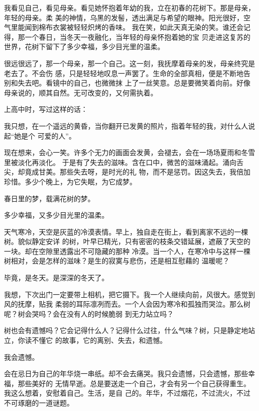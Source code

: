 		我看见自己，看见母亲。看见她怀抱着年幼的我，立在初春的花树下。那是母亲，年轻的母亲。柔
	美的神情，乌黑的发髻，透出满足与希望的眼神。阳光很好，空气里能闻到棉布衣裳被轻轻炽烤的香味。
	我在笑，如此天真无染的笑。谁还会记得，那一个春日，当冬天一夜融化，当年轻的母亲怀抱着她的宝
	贝走进这复苏的世界，花树下留下了多少幸福，多少目光里的温柔。

		很远很远了，那一个母亲，那一个自己。这一刻，我抚摩着母亲的发，母亲终究是老去了。不会伤
	感，只是轻轻地叹息一声罢了。生命的全部真相，便是不断地告别和失去吧。看镜中的自己，也微微抹
	上了一丝笑意。总是要微笑着向前。好像母亲说的，顺其自然。无可改变的，又何需执着。

		上高中时，写过这样的话：

		\longpoem{}{}{} \setlength{\parindent}{2\ccwd}
			我只想，在一个遥远的黄昏，当你翻开已发黄的照片，指着年轻的我，对什么人说起“她是个
		可爱的人”。
		\endlongpoem

		现在想来，会心一笑。许多个无力的画面会发黄，会褪去，会在一场场夏雨和冬雪里被淡化再淡化。
	于是有了失去的滋味。含在口中，微苦的滋味涌起。涌向舌尖，却竟成甘美。那些失去呀，是时光的礼
	物，而不是惩罚。因这失去，我倍加珍惜。多少个晚上，为它失眠，为它成梦。

		春日里的梦，载满花树的梦。

		多少幸福，又多少目光里的温柔。

	\endwriting



		天气寒冷，天空是灰蓝的冷漠表情。早上，独自走在街上，看到离家不远的一棵树。貌似静定安详
	的树，叶早已精光，只有密密的枝条交错延展，遮蔽了天空的一块。却在空隙里透露出不可隐藏的那种
	冷漠。当一个人，在寒冷中与这样一棵树相对，会是怎样的滋味？是生的寂寞与悲伤，还是相互慰藉的
	温暖呢？

		毕竟，是冬天。是深深的冬天了。

		我想，下次出门一定要带上相机，把它摄下。我一个人继续向前，风很大。感觉到风的抚摩，贴我
	柔弱的耳际凛冽而去。一个人会因为寒冷和孤独而哭泣。那么树呢？树会哭吗？会在没有人的时候脆弱
	到无力站立吗？

		树也会有遗憾吗？它会记得什么人？记得什么过往，什么气味？树，只是静定地站立，你读不懂它
	的故事，它的离别、失去，和遗憾。

		我会遗憾。

		会在忌日为自己的年华烧一串纸。却不会去痛哭。我只会遗憾，只会遗憾，那些幸福，那些美好的
	无情早逝。总是要送走一个自己，才会有另一个自己获得重生。我这么想着，安慰着自己。生活，是自
	己的。年华，不过烟花，不过流火，不过不可琢磨的一道谜题。

